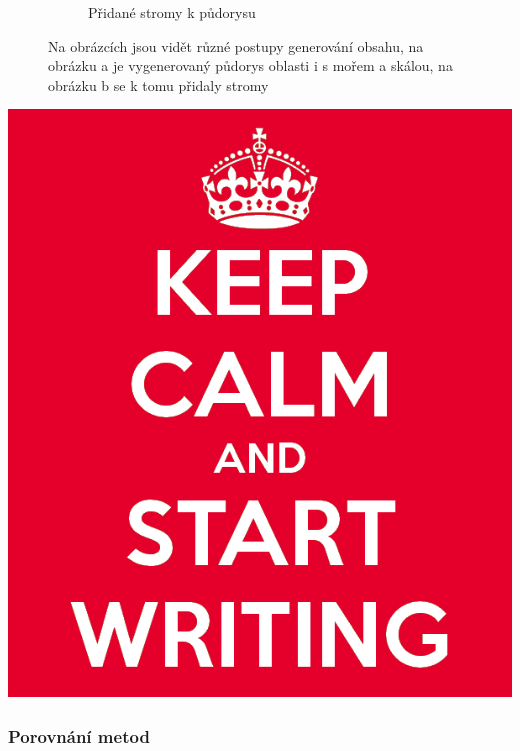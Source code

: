 \begin{figure}[h]
\begin{subfigure}{0.475\textwidth}
		\caption{Přidané stromy k půdorysu}
	\end{subfigure}
	\caption{Na obrázcích jsou vidět různé postupy generování obsahu, na obrázku a je vygenerovaný půdorys oblasti i s mořem a skálou, na obrázku b se k tomu přidaly stromy}
\end{figure}

	




\includegraphics[scale=0.3]{obrazky-figures/keep-calm.png}

\textcolor{gray}{\blindtext[4]}


\subsubsection{Porovnání metod}
\textcolor{gray}{\blindtext[8]}

